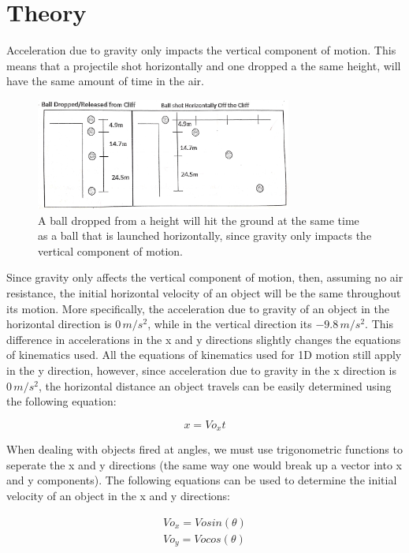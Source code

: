\section{Theory}
\vspace{-0.5cm}
\singlespacing

Acceleration due to gravity only impacts the vertical component of motion. This means that a projectile shot horizontally and one dropped a the same height, will have the same amount of time in the air. \par

\begin{figure}[H]
	\begin{center}
		\includegraphics[width=0.75\textwidth]{images/2DMotion}
	\end{center}
	\caption{A ball dropped from a height will hit the ground at the same time as a ball
 that is launched horizontally, since gravity only impacts the vertical component of motion.}\label{fig:2DMotion}
\end{figure}

Since gravity only affects the vertical component of motion, then, assuming no air resistance, the initial horizontal velocity of an object will be the same throughout its motion. More specifically, the acceleration due to gravity of an object in the horizontal direction is $0\,m/s^2$, while in the vertical direction its $-9.8\,m/s^2$. This difference in accelerations in the x and y directions slightly changes the equations of kinematics used. All the equations of kinematics used for 1D motion still apply in the y direction, however, since acceleration due to gravity in the x direction is $0\,m/s^2$, the horizontal distance an object travels can be easily determined using the following equation:

\vspace{-0.5cm}
\begin{equation*}
	x = V\!o_xt
\end{equation*}

When dealing with objects fired at angles, we must use trigonometric functions to seperate the x and y directions (the same way one would break up a vector into x and y components). The following equations can be used to determine the initial velocity of an object in the x and y directions:

\begin{equation*}
\begin{aligned}
	V\!o_x = V\!osin(\theta) \\
	V\!o_y = V\!ocos(\theta)
\end{aligned}
\end{equation*}
\newpage


